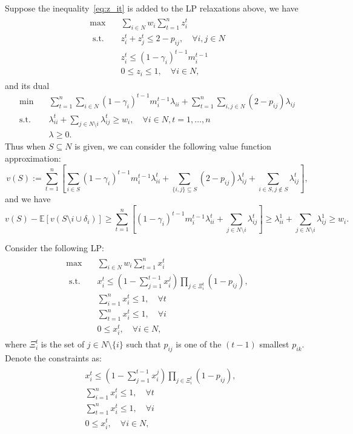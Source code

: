 \documentclass[10pt,leqno]{amsart}
\newcommand{\E}{\mathbb{E}}
\begin{document}
Suppose the inequality~\eqref{eq:z_it} is added to the LP relaxations above, we have
\begin{align*}
  \begin{split}
    \max\quad &\sum_{i\in N}w_i\sum_{t=1}^{n}z^t_i\\
    \text{ s.t.}\quad&z^t_i+z^t_j\leq 2-p_{ij},\quad\forall i,j\in N\\
    &z_i^t\leq (1-\gamma_i)^{t-1}{m}_i^{t-1}\\
    &0\leq z_i\leq 1,\quad \forall i\in N,
  \end{split}
\end{align*}
and its dual
\begin{align*}
  \min\quad &\sum_{t=1}^{n}\sum_{i\in N}(1-\gamma_i)^{t-1}{m}_i^{t-1}\lambda_{ii}+\sum_{t=1}^{n}\sum_{i,j\in N}(2-p_{ij})\lambda_{ij}\\
  \text{s.t.}\quad &\lambda^t_{ii}+\sum_{j\in N\setminus i}\lambda^t_{ij}\geq w_i,\quad \forall i\in N,t=1,\ldots,n\\
  &\lambda\geq 0.
\end{align*}
Thus when $S\subseteq N$ is given, we can consider the following value function approximation:
\[v(S):=\sum_{t=1}^{n}\left[\sum_{i\in S}(1-\gamma_i)^{t-1}{m}_i^{t-1}\lambda^t_{ii}+\sum_{\{i,j\}\subseteq S}(2-p_{ij})\lambda^t_{ij}+\sum_{i\in S,j\notin S}\lambda^t_{ij}\right],\]
and we have
\[v(S)-\E[v(S\setminus i\cup\delta_i)]\geq \sum_{t=1}^{n}\left[(1-\gamma_i)^{t-1}{m}_i^{t-1}\lambda^t_{ii}+\sum_{j\in N\setminus i}\lambda_{ij}^t\right]\geq \lambda_{ii}^1+\sum_{j\in N\setminus i}\lambda_{ij}^1\geq w_i.\]

Consider the following LP:
\begin{align*}
  \begin{split}
    \max\quad &\sum_{i\in N}w_i\sum_{t=1}^{n}x^t_i\\
    \text{ s.t. }
    &x_i^t\leq \left(1-\sum_{j=1}^{t-1}x_i^j\right)\prod_{j\in\Xi_i^t}(1-p_{ij}),\\
    &\sum_{i=1}^{n}x_i^t\leq1,\quad\forall t\\
    &\sum_{t=1}^{n}x_i^t\leq1,\quad\forall i\\
    &0\leq x^t_i,\quad \forall i\in N,
  \end{split}
\end{align*}
where $\Xi_i^t$ is the set of $j\in N\setminus\{i\}$ such that $p_{ij}$ is one of the $(t-1)$ smallest $p_{ik}$.
Denote the constraints as:
\begin{align}
  \label{eq:LP constraints}
  \begin{split}
    &x_i^t\leq \left(1-\sum_{j=1}^{t-1}x_i^j\right)\prod_{j\in\Xi_i^t}(1-p_{ij}),\\
    &\sum_{i=1}^{n}x_i^t\leq1,\quad\forall t\\
    &\sum_{t=1}^{n}x_i^t\leq1,\quad\forall i\\
    &0\leq x^t_i,\quad \forall i\in N,
  \end{split}
\end{align}
\end{document}
